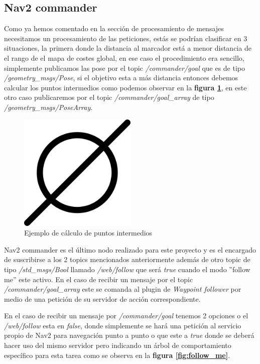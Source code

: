 \subsection{Nav2 commander}
Como ya hemos comentado en la sección de procesamiento de mensajes necesitamos un procesamiento de las peticiones, estás se podrían clasificar en 3 situaciones, la primera 
donde la distancia al marcador está a menor distancia de el rango de el mapa de costes global, en ese caso el procedimiento era sencillo, simplemente publicamos las pose por el topic 
\textit{/commander/goal} que es de tipo \textit{/geometry\_msgs/Pose}, si el objetivo esta a más distancia entonces debemos calcular los puntos intermedios como podemos observar en la 
\textbf{figura \ref{fig:puntos_intermedios}}, en este otro caso publicaremos por el topic \textit{/commander/goal\_array} de tipo \textit{/geometry\_msgs/PoseArray}.


\begin{figure}[H]
    \centering
    \includegraphics[width=0.5\textwidth]{images/poner_foto.png}
    \caption{Ejemplo de cálculo de puntos intermedios}
    \label{fig:puntos_intermedios}
\end{figure}

Nav2 commander es el último nodo realizado para este proyecto y es el encargado de suscribirse a los 2 topics mencionados anteriormente 
además de otro topic de tipo \textit{/std\_msgs/Bool} llamado \textit{/web/follow} que será \textit{true} cuando el modo ''follow me'' este activo. En 
el caso de recibir un mensaje por el topic \textit{/commander/goal\_array} este se comanda al plugin de \textit{Waypoint follower} por medio de 
una petición de su servidor de acción correspondiente.

En el caso de recibir un mensaje por \textit{/commander/goal} tenemos 2 opciones o el \textit{/web/follow} esta en \textit{false}, donde simplemente 
se hará una petición al servicio propio de Nav2 para navegación punto a punto o que este a \textit{true} donde se deberá hacer uso del mismo servidor pero 
indicando un árbol de comportamiento específico para esta tarea como se observa en la \textbf{figura \ref{fig:follow_me}}.

